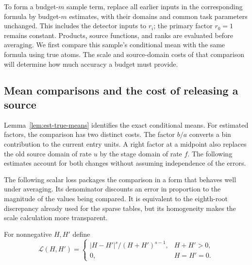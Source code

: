 To form a budget-$m$ sample term, replace all earlier inputs in the
corresponding formula by budget-$m$ estimates, with their domains and
common task parameters unchanged.  This includes the detector inputs
to $r_i$; the primary factor $r_0=1$ remains constant.  Products, source
functions, and ranks are evaluated before averaging.  We first compare
this sample's conditional mean with the same formula using true atoms.
The scale and source-domain costs of that comparison will determine
how much accuracy a budget must provide.

\subsection{Mean comparisons and the cost of releasing a source}

Lemma~\ref{lem:est-true-means} identifies the exact conditional means.
For estimated factors, the comparison has two distinct costs.  The
factor $b/a$ converts a bin contribution to the current entry units.
A right factor at a midpoint also replaces the old source domain of
rate $u$ by the stage domain of rate $f$.  The following estimates
account for both changes without assuming independence of the errors.

The following scalar loss packages the comparison in a form that behaves well under averaging. Its denominator discounts an error in proportion to the magnitude of the values being compared. It is equivalent to the eighth-root discrepancy already used for the sparse tables, but its homogeneity makes the scale calculation more transparent.

For nonnegative $H,H'$ define
\begin{equation}
 \mathcal L(H,H')=
 \begin{cases}|H-H'|^s/(H+H')^{s-1},&H+H'>0,\\0,&H=H'=0.
 \end{cases}
 \label{eq:est-loss}
\end{equation}


